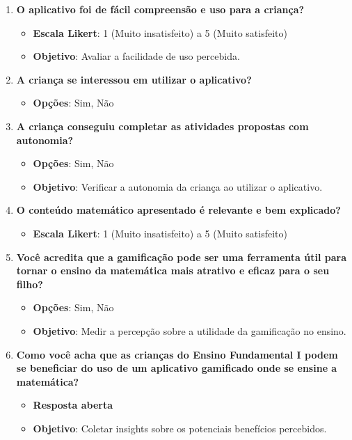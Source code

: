 \begin{enumerate}
    \item \textbf{O aplicativo foi de fácil compreensão e uso para a criança?}
    \begin{itemize}
        \item \textbf{Escala Likert}: 1 (Muito insatisfeito) a 5 (Muito satisfeito)
        \item \textbf{Objetivo}: Avaliar a facilidade de uso percebida.
    \end{itemize}

    \item \textbf{A criança se interessou em utilizar o aplicativo?}
    \begin{itemize}
        \item \textbf{Opções}: Sim, Não
    \end{itemize}

    \item \textbf{A criança conseguiu completar as atividades propostas com autonomia?}
    \begin{itemize}
        \item \textbf{Opções}: Sim, Não
        \item \textbf{Objetivo}: Verificar a autonomia da criança ao utilizar o aplicativo.
    \end{itemize}

    \item \textbf{O conteúdo matemático apresentado é relevante e bem explicado?}
    \begin{itemize}
        \item \textbf{Escala Likert}: 1 (Muito insatisfeito) a 5 (Muito satisfeito)
    \end{itemize}

    \item \textbf{Você acredita que a gamificação pode ser uma ferramenta útil para tornar o ensino da matemática mais atrativo e eficaz para o seu filho?}
    \begin{itemize}
        \item \textbf{Opções}: Sim, Não
        \item \textbf{Objetivo}: Medir a percepção sobre a utilidade da gamificação no ensino.
    \end{itemize}

    \item \textbf{Como você acha que as crianças do Ensino Fundamental I podem se beneficiar do uso de um aplicativo gamificado onde se ensine a matemática?}
    \begin{itemize}
        \item \textbf{Resposta aberta}
        \item \textbf{Objetivo}: Coletar insights sobre os potenciais benefícios percebidos.
    \end{itemize}
\end{enumerate}

